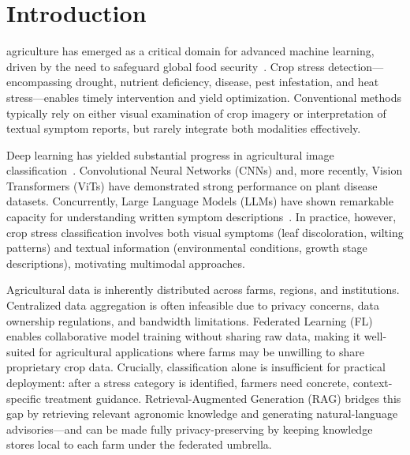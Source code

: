 \documentclass[10pt,journal,compsoc]{IEEEtran}
\begin{document}
\maketitle

\IEEEdisplaynontitleabstractindextext

\section{Introduction}
 agriculture has emerged as a critical domain for advanced machine learning, driven by the need to safeguard global food security~\cite{kamilaris2018deep}. Crop stress detection---encompassing drought, nutrient deficiency, disease, pest infestation, and heat stress---enables timely intervention and yield optimization. Conventional methods typically rely on either visual examination of crop imagery or interpretation of textual symptom reports, but rarely integrate both modalities effectively.

Deep learning has yielded substantial progress in agricultural image classification~\cite{mohanty2016using}. Convolutional Neural Networks (CNNs) and, more recently, Vision Transformers (ViTs) have demonstrated strong performance on plant disease datasets. Concurrently, Large Language Models (LLMs) have shown remarkable capacity for understanding written symptom descriptions~\cite{devlin2018bert}. In practice, however, crop stress classification involves both visual symptoms (leaf discoloration, wilting patterns) and textual information (environmental conditions, growth stage descriptions), motivating multimodal approaches.

Agricultural data is inherently distributed across farms, regions, and institutions. Centralized data aggregation is often infeasible due to privacy concerns, data ownership regulations, and bandwidth limitations. Federated Learning (FL)~\cite{mcmahan2017communication} enables collaborative model training without sharing raw data, making it well-suited for agricultural applications where farms may be unwilling to share proprietary crop data. Crucially, classification alone is insufficient for practical deployment: after a stress category is identified, farmers need concrete, context-specific treatment guidance. Retrieval-Augmented Generation (RAG) bridges this gap by retrieving relevant agronomic knowledge and generating natural-language advisories---and can be made fully privacy-preserving by keeping knowledge stores local to each farm under the federated umbrella.
\end{document}
